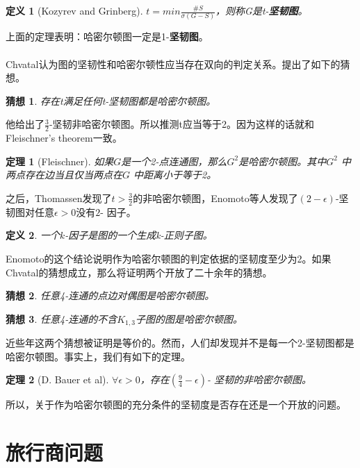 \documentclass[11pt,a4paper,openany]{book}
\newtheorem{theorem}{\textbf{定理}}[section]
\newtheorem{defination}{\textbf{定义}}[section]
\newtheorem{guess}{\textbf{猜想}}[section]
\begin{document}
\begin{defination}[Kozyrev and Grinberg] \K $t=min\frac{\#S}{\sigma(G-S)}$，则称G是t-\textbf{坚韧图}。\end{defination}

上面的定理表明：哈密尔顿图一定是1-\textbf{坚韧图}。
\\
\\
Chvatal认为图的坚韧性和哈密尔顿性应当存在双向的判定关系。提出了如下的猜想。
\begin{guess} \K 存在t满足任何t-坚韧图都是哈密尔顿图。\end{guess}
他给出了$\frac{3}{2}$-坚韧非哈密尔顿图。所以推测t应当等于2。因为这样的话就和Fleischner's theorem一致。

\begin{theorem}[Fleischner] \K 如果$G$是一个2-点连通图，那么$G^2$是哈密尔顿图。其中$G^2$ 中两点存在边当且仅当两点在$G$ 中距离小于等于2。\end{theorem}

之后，Thomassen发现了$t>\frac{3}{2}$的非哈密尔顿图，Enomoto等人发现了$(2-\epsilon)$-坚韧图对任意$\epsilon > 0$没有$2$- 因子。
\begin{defination} 一个$k$-因子是图的一个生成k-正则子图。\end{defination}

Enomoto的这个结论说明作为哈密尔顿图的判定依据的坚韧度至少为2。如果Chvatal的猜想成立，那么将证明两个开放了二十余年的猜想。
\begin{guess} \K 任意4-连通的点边对偶图是哈密尔顿图。\end{guess}
\begin{guess} \K 任意4-连通的不含$K_{1,3}$子图的图是哈密尔顿图。\end{guess}
近些年这两个猜想被证明是等价的。然而，人们却发现并不是每一个2-坚韧图都是哈密尔顿图。事实上，我们有如下的定理。

\begin{theorem}[D. Bauer et al] \K $\forall \epsilon > 0$，存在$(\frac{9}{4}-\epsilon)$- 坚韧的非哈密尔顿图。\end{theorem}

所以，关于作为哈密尔顿图的充分条件的坚韧度是否存在还是一个开放的问题。
\section{旅行商问题}
\end{document}
